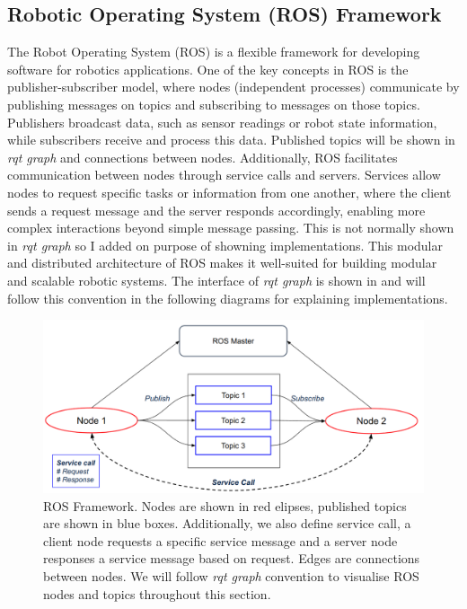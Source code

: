 \subsection{Robotic Operating System (ROS) Framework}
The Robot Operating System (ROS) is a flexible framework for developing software for robotics applications. One of the key concepts in ROS is the publisher-subscriber model, where nodes (independent processes) communicate by publishing messages on topics and subscribing to messages on those topics. Publishers broadcast data, such as sensor readings or robot state information, while subscribers receive and process this data. Published topics will be shown in \emph{rqt graph} and connections between nodes. Additionally, ROS facilitates communication between nodes through service calls and servers. Services allow nodes to request specific tasks or information from one another, where the client sends a request message and the server responds accordingly, enabling more complex interactions beyond simple message passing. This is not normally shown in \emph{rqt graph} so I added on purpose of showning implementations. This modular and distributed architecture of ROS makes it well-suited for building modular and scalable robotic systems. The interface of \emph{rqt graph} is shown in  and will follow this convention in the following diagrams for explaining implementations. 
\begin{figure}[t]
  \centering
  \includegraphics[width=0.8\columnwidth]{pics/Implementation_ros_framework2.png}
  \caption{ROS Framework. Nodes are shown in red elipses, published topics are shown in blue boxes. Additionally, we also define service call, a client node requests a specific service message and a server node responses a service message based on request. Edges are connections between nodes. We will follow \emph{rqt graph} convention to visualise ROS nodes and topics throughout this section.}
  \label{fig:implementation_ros}
\end{figure}

